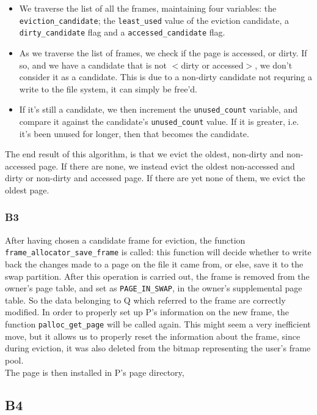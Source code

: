 \documentclass[a4wide, 11pt]{article}
\newcommand{\tx}{\texttt}
\begin{document}
\begin{itemize}
\item We traverse the list of all the frames, maintaining four variables: the \tx{eviction\_candidate}; the \tx{least\_used} value of the eviction candidate, a \tx{dirty\_candidate} flag and a \tx{accessed\_candidate} flag.

\item As we traverse the list of frames, we check if the page is accessed, or dirty. If so, and we have a candidate that is not $<$dirty or accessed$>$, we don't consider it as a candidate. This is due to a non-dirty candidate not requring a write to the file system, it can simply be free'd.

\item If it's still a candidate, we then increment the \tx{unused\_count} variable, and compare it against the candidate's \tx{unused\_count} value. If it is greater, i.e. it's been unused for longer, then that becomes the candidate.
\end{itemize}

The end result of this algorithm, is that we evict the oldest, non-dirty and non-accessed page. If there are none, we instead evict the oldest non-accessed and dirty or non-dirty and accessed page. If there are yet none of them, we evict the oldest page.

\subsubsection{B3}
After having chosen a candidate frame for eviction, the function \tx{frame\_allocator\_save\_frame} is called: this function will decide whether to write back the changes made to a page on the file it came from, or else, save it to the swap partition. After this operation is carried out, the frame is removed from the owner's page table, and set as \tx{PAGE\_IN\_SWAP}, in the owner's supplemental page table. So the data belonging to Q which referred to the frame are correctly modified.
In order to properly set up P's information on the new frame, the function \tx{palloc\_get\_page} will be called again. This might seem a very inefficient move, but it allows us to properly reset the information about the frame, since during eviction, it was also deleted from the bitmap representing the user's frame pool.\\
The page is then installed in P's page directory,   


\subsection{B4}
\end{document}
